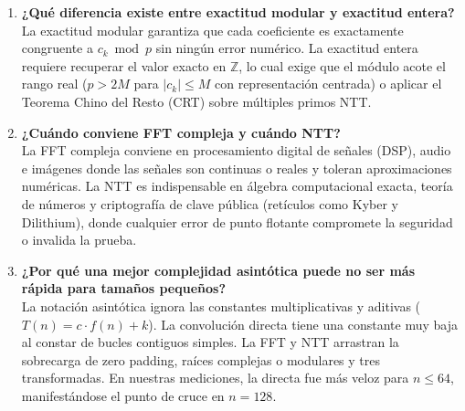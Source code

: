 \begin{enumerate}
    \item \textbf{¿Qué diferencia existe entre exactitud modular y exactitud entera?}\\
    La exactitud modular garantiza que cada coeficiente es exactamente congruente a $c_k \bmod p$ sin ningún error numérico. La exactitud entera requiere recuperar el valor exacto en $\mathbb{Z}$, lo cual exige que el módulo acote el rango real ($p > 2M$ para $|c_k| \le M$ con representación centrada) o aplicar el Teorema Chino del Resto (CRT) sobre múltiples primos NTT.

    \item \textbf{¿Cuándo conviene FFT compleja y cuándo NTT?}\\
    La FFT compleja conviene en procesamiento digital de señales (DSP), audio e imágenes donde las señales son continuas o reales y toleran aproximaciones numéricas. La NTT es indispensable en álgebra computacional exacta, teoría de números y criptografía de clave pública (retículos como Kyber y Dilithium), donde cualquier error de punto flotante compromete la seguridad o invalida la prueba.

    \item \textbf{¿Por qué una mejor complejidad asintótica puede no ser más rápida para tamaños pequeños?}\\
    La notación asintótica ignora las constantes multiplicativas y aditivas ($T(n) = c \cdot f(n) + k$). La convolución directa tiene una constante muy baja al constar de bucles contiguos simples. La FFT y NTT arrastran la sobrecarga de zero padding, raíces complejas o modulares y tres transformadas. En nuestras mediciones, la directa fue más veloz para $n \le 64$, manifestándose el punto de cruce en $n = 128$.
\end{enumerate}
